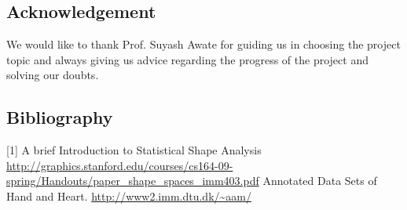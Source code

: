 \documentclass[paper=a4, fontsize=11pt,twoside]{scrartcl}	%
\begin{document}
\subsection{Acknowledgement}
We would like to thank Prof. Suyash Awate for guiding us in choosing the project topic and always giving us advice regarding the progress of the project and solving our doubts.

\subsection{Bibliography}
[1] A brief Introduction to Statistical Shape Analysis 
\url{http://graphics.stanford.edu/courses/cs164-09-spring/Handouts/paper_shape_spaces_imm403.pdf}
\newline
[2] Annotated Data Sets of Hand and Heart. 
\url{http://www2.imm.dtu.dk/~aam/}
\end{document}
